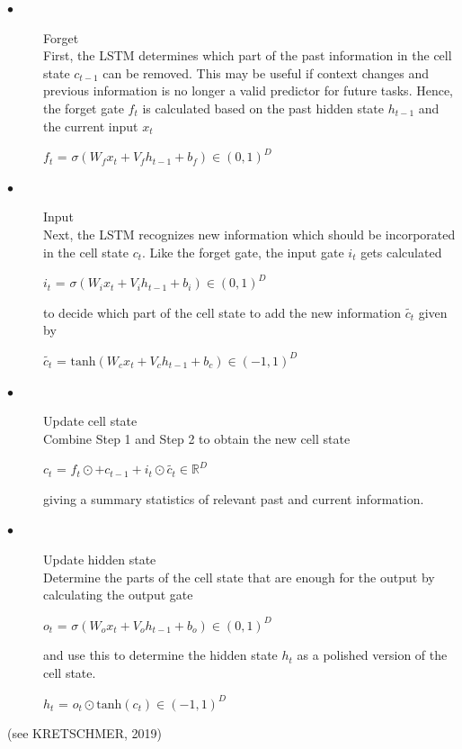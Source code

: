 \documentclass[a4paper,11pt,oneside]{book}
\begin{document}
\begin{description}
	\item[$\bullet$] Forget\\
	First, the LSTM determines which part of the past information in the cell state $c_{t-1}$ can be removed. This may be useful if context changes and previous information is no longer a valid predictor for future tasks. Hence, the forget gate $f_t$ is calculated based on the  past hidden state $h_{t-1}$ and the current input $x_t$
\begin{center}
	$f_t$ =  $\sigma(W_{f}x_{t}+V_{f}h_{t-1}+b_{f})\in (0,1)^{D}$
\end{center}
\item[$\bullet$] Input\\
Next, the LSTM recognizes new information which should be incorporated in the cell state $c_t$. Like the forget gate, the input gate $i_t$ gets calculated
\begin{center}
	$i_t$ =  $\sigma(W_{i}x_{t}+V_{i}h_{t-1}+b_{i})\in (0,1)^{D}$
\end{center}
to decide which part of the cell state to add the new information $\tilde{c_t}$ given by 
\begin{center}
	$\tilde{c_t}$ =  $\text{tanh}(W_{c}x_{t}+V_{c}h_{t-1}+b_{c})\in (-1,1)^{D}$
\end{center}

\item[$\bullet$] Update cell state\\
Combine Step 1 and Step 2 to obtain the new cell state

\begin{center}
	${c_t}$ =  $f_{t} \odot+c_{t-1}+i_{t}\odot \tilde{c_t} \in \mathbb{R}^{D}$
\end{center}
giving a summary statistics of relevant past and current information.

\item[$\bullet$] Update hidden state\\
Determine the parts of the cell state that are enough for the output by calculating
the output gate
\begin{center}
	$o_t$ =  $\sigma(W_{o}x_{t}+V_{o}h_{t-1}+b_{o})\in (0,1)^{D}$
\end{center}
and use this to determine the hidden state $h_t$ as a polished version of the cell state.

\begin{center}
	$h_t$ =  $o_t \odot \text{tanh}(c_t)\in (-1,1)^{D}$
\end{center}

\end{description}
(see KRETSCHMER, 2019)
\end{document}
